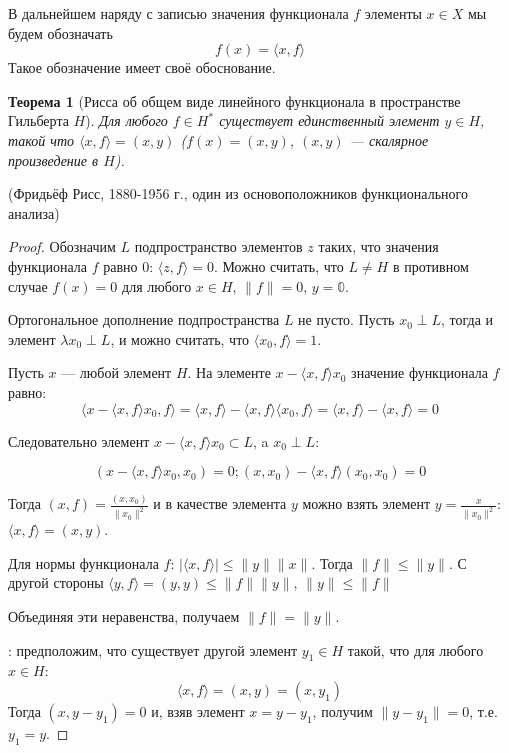\documentclass[12pt,a4paper,titlepage,oneside]{book}
\theoremstyle{definition}
\theoremstyle{plain}
\newtheorem*{theorem}{Теорема}
\theoremstyle{break}
\theoremstyle{remark}
\theoremstyle{remark}
\theoremstyle{remark}
\theoremstyle{remark}
\theoremstyle{plain}
\theoremstyle{plain}
\begin{document}
В дальнейшем наряду с записью значения функционала $f$ элементы $x \in X$ мы будем обозначать
\begin{equation*}
f(x) =  \langle x, f \rangle 
\end{equation*}
Такое обозначение имеет своё обоснование.
\begin{theorem}[Рисса об общем виде линейного функционала в пространстве Гильберта $H$]
Для любого $f \in H^*$ существует единственный элемент $y \in H$, такой что $ \langle x, f \rangle =(x,y)$ ($f(x)=(x,y)$, $(x,y)$ --- скалярное произведение в $H$).
\end{theorem}

(Фридьёф Рисс, 1880-1956 г., один из основоположников функционального анализа)

\begin{proof}
Обозначим $L$ подпространство элементов $z$ таких, что значения функционала $f$ равно 0: $ \langle z, f \rangle =0$. Можно считать, что $L\ne H$ в противном случае $f(x)=0$ для любого $x\in H$, $\lVert f\rVert = 0$, $y=\mathbb{0}$.

Ортогональное дополнение подпространства $L$ не пусто. Пусть $x_0\perp L$, тогда и элемент $\lambda x_0\perp L$, и можно считать, что $ \langle x_0, f \rangle =1$.

Пусть $x$ --- любой элемент $H$. На элементе $x- \langle x, f \rangle x_0$ значение функционала $f$ равно:
\begin{equation*}
 \langle x- \langle x, f \rangle x_0, f \rangle  =  \langle x, f \rangle - \langle x, f \rangle  \langle x_0, f \rangle  =  \langle x, f \rangle - \langle x, f \rangle  = 0
\end{equation*}

Следовательно элемент $x- \langle x, f \rangle x_0 \subset L$, a $x_0\perp L$:

\begin{equation*}
(x- \langle x, f \rangle x_0, x_0) = 0; (x, x_0) -  \langle x, f \rangle (x_0, x_0) = 0
\end{equation*}

Тогда $(x, f) = \frac{(x, x_0)}{\lVert x_0\rVert^2}$ и в качестве элемента $y$ можно взять элемент $y=\frac{x}{\lVert x_0\rVert^2}$:$ \langle x, f \rangle  = (x, y)$.

Для нормы функционала $f$: $\lvert  \langle x, f \rangle \rvert \leqslant \lVert y\rVert\lVert x\rVert$. Тогда $\lVert f\rVert \leqslant \lVert y\rVert$. С другой стороны $ \langle y, f \rangle  = (y, y) \leqslant \lVert f\rVert\lVert y\rVert$, $\lVert y\rVert\le\lVert f\rVert$

Объединяя эти неравенства, получаем $\lVert f\rVert = \lVert y\rVert$.

: предположим, что существует другой элемент $y_1 \in H$ такой, что для любого $x\in H$:
\begin{equation*}
 \langle x, f \rangle  = (x, y) = (x, y_1)
\end{equation*}
Тогда $(x, y-y_1) = 0$ и, взяв элемент $x = y-y_1$, получим $\lVert y-y_1\rVert = 0$, т.е. $y_1 = y$.
\end{proof}
\end{document}
